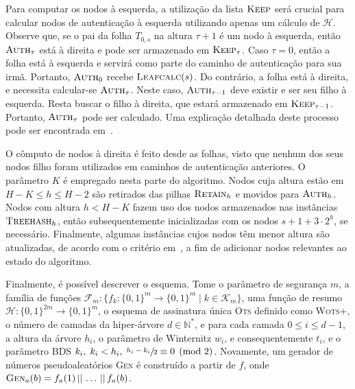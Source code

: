 \documentclass[12pt,notitlepage]{report}
\newcommand{\hh}{\mathcal{H}}
\newcommand{\concat}{\, \vert \vert \,}
\newcommand{\binwds}[1]{\{0, 1\}^{#1}}
\begin{document}
Para computar os nodos à esquerda, a utilização da lista $\textsc{Keep}$ será crucial para calcular nodos de autenticação à esquerda utilizando apenas um cálculo de $\hh{}$. Observe que, se o pai da folha $T_{0, s}$ na altura $\tau + 1$ é um nodo à esquerda, então $\textsc{Auth}_{\tau}$ está à direita e pode ser armazenado em $\textsc{Keep}_{\tau}$. Caso $\tau = 0$, então a folha está à esquerda e servirá como parte do caminho de autenticação para sua irmã. Portanto,
$\textsc{Auth}_{0}$ recebe $\textsc{Leafcalc}(s)$. Do contrário, a folha está à direita, e necessita calcular-se $\textsc{Auth}_{\tau}$. Neste caso, $\textsc{Auth}_{\tau - 1}$ deve existir e ser seu filho à esquerda. Resta buscar o filho à direita, que estará armazenado em $\textsc{Keep}_{\tau - 1}$. Portanto, $\textsc{Auth}_{\tau}$ pode ser calculado. Uma explicação detalhada deste processo pode ser encontrada em~\cite[2.1]{Buchmann:2008:MTT:1473109.1473114}.

O cômputo de nodos à direita é feito desde as folhas, visto que nenhum dos seus nodos filho foram utilizados em caminhos de autenticação anteriores. O parâmetro $K$ é empregado nesta parte do algoritmo. Nodos cuja altura estão em $H - K \leq h \leq H - 2$ são retirados das pilhas $\textsc{Retain}_{h}$ e movidos para $\textsc{Auth}_h$. Nodos com altura $h < H - K$ fazem uso dos nodos armazenados nas instâncias $\textsc{Treehash}_{h}$, então subsequentemente inicializadas com
os nodos $s + 1 + 3 \cdot 2^h$, se necessário. Finalmente, algumas instâncias cujos nodos têm menor altura são atualizadas, de acordo com o critério em~\cite[4.5]{Bernstein:2008:PQC:1522375}, a fim de adicionar nodos relevantes ao estado do algoritmo.

Finalmente, é possível descrever o esquema. Tome o parâmetro de segurança $m$, a família de funções $\mathcal{F}_m : \{f_k : \binwds{m} \longrightarrow \binwds{m} \mid k \in \mathcal{K}_m\}$, uma função de resumo $\hh{} : \binwds{2m} \longrightarrow \binwds{m}$, o esquema de assinatura única \textsc{Ots} definido como \textsc{Wots+}, o número de camadas da hiper-árvore $d \in \mathbb{N}^{*}$, e para cada camada $0 \leq i \leq d - 1$, a altura da árvore $h_i$, o parâmetro de Winternitz $w_i$, e consequentemente $t_i$, e o parâmetro BDS $k_i, \; k_i < h_i, \; \sfrac{h_i - k_i}{2} \equiv 0 \pmod{2}$. Novamente, um gerador de números pseudoaleatórios \textsc{Gen} é construído a partir de $f$, onde $\textsc{Gen}_{a}(b) = f_a(1) \concat \dots \concat f_a(b)$.
\end{document}
